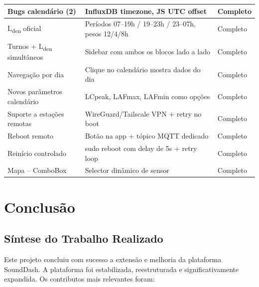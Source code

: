 \documentclass[12pt,a4paper]{report}
\begin{document}
\begin{table}[H]
\begin{tabular}{|p{4.5cm}|p{6cm}|l|}
\hline
Bugs calendário (2)         & InfluxDB timezone, JS UTC offset          & Completo \\
\hline
L\textsubscript{den} oficial & Períodos 07--19h / 19--23h / 23--07h, pesos 12/4/8h & Completo \\
\hline
Turnos + L\textsubscript{den} simultâneos & Sidebar com ambos os blocos lado a lado & Completo \\
\hline
Navegação por dia           & Clique no calendário mostra dados do dia  & Completo \\
\hline
Novos parâmetros calendário & LCpeak, LAFmax, LAFmin como opções        & Completo \\
\hline
Suporte a estações remotas       & WireGuard/Tailscale VPN + retry no boot   & Completo \\
\hline
Reboot remoto               & Botão na app + tópico MQTT dedicado       & Completo \\
\hline
Reinício controlado         & sudo reboot com delay de 5s + retry loop  & Completo \\
\hline
Mapa -- ComboBox            & Selector dinâmico de sensor               & Completo \\
\hline
\end{tabular}
\end{table}

\chapter{Conclusão}
\label{sec:conclusao}

\section{Síntese do Trabalho Realizado}

Este projeto concluiu com sucesso a extensão e melhoria da plataforma SoundDash. A plataforma foi estabilizada, reestruturada e significativamente expandida. Os contributos mais relevantes foram:
\end{document}
